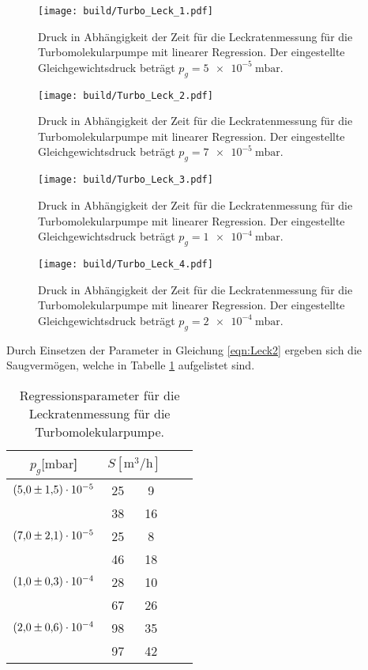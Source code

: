 \begin{figure}[H]
    \centering
    \texttt{[image: build/Turbo\_Leck\_1.pdf]}
    \caption{Druck in Abhängigkeit der Zeit für die Leckratenmessung für die Turbomolekularpumpe mit linearer Regression. Der eingestellte Gleichgewichtsdruck beträgt $p_g=\SI{5e-5}{\milli\bar}$.}
    \label{fig:turbo_leck1}
\end{figure}
\noindent
\begin{figure}[H]
    \centering
    \texttt{[image: build/Turbo\_Leck\_2.pdf]}
    \caption{Druck in Abhängigkeit der Zeit für die Leckratenmessung für die Turbomolekularpumpe mit linearer Regression. Der eingestellte Gleichgewichtsdruck beträgt $p_g=\SI{7e-5}{\milli\bar}$.}
    \label{fig:turbo_leck2}
\end{figure}
\noindent
\begin{figure}[H]
    \centering
    \texttt{[image: build/Turbo\_Leck\_3.pdf]}
    \caption{Druck in Abhängigkeit der Zeit für die Leckratenmessung für die Turbomolekularpumpe mit linearer Regression. Der eingestellte Gleichgewichtsdruck beträgt $p_g=\SI{1e-4}{\milli\bar}$.}
    \label{fig:turbo_leck3}
\end{figure}
\noindent
\begin{figure}[H]
    \centering
    \texttt{[image: build/Turbo\_Leck\_4.pdf]}
    \caption{Druck in Abhängigkeit der Zeit für die Leckratenmessung für die Turbomolekularpumpe mit linearer Regression. Der eingestellte Gleichgewichtsdruck beträgt $p_g=\SI{2e-4}{\milli\bar}$.}
    \label{fig:turbo_leck4}
\end{figure}
\noindent
Durch Einsetzen der Parameter in Gleichung \ref{eqn:Leck2} ergeben sich die Saugvermögen, welche in 
Tabelle \ref{tab:Saug_Turbo_Leck} aufgelistet sind.
\begin{table}[H]
  \centering
    \caption{Regressionsparameter für die Leckratenmessung für die Turbomolekularpumpe.}
    \label{tab:Saug_Turbo_Leck}
    \begin{tabular}{c c @{${}\pm{}$} c c @{${}\pm{}$} c}
      \toprule
      {$p_g [\si{\milli\bar}$]} & \multicolumn{2}{c}{$S [\si{\cubic\metre\per\hour}]$} \\
      \midrule
      $\num{5.0 \pm 1.5 e-5}$  & 25 & 9 \\
                               & 38 & 16\\
      \midrule
      $\num{7.0 \pm 2.1 e-5}$  & 25 & 8 \\
                               & 46 & 18\\
      \midrule
      $\num{1.0 \pm 0.3 e-4}$  & 28 & 10\\
                               & 67 & 26\\
      \midrule
      $\num{2.0 \pm 0.6 e-4}$  & 98 & 35\\
                               & 97 & 42\\
      \bottomrule
    \end{tabular}
\end{table}